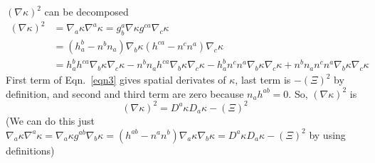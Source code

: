 \documentclass[prd]{revtex4}
\begin{document}
$(\nabla \kappa)^2$ can be decomposed
\begin{align}
\label{eqn3}
(\nabla \kappa)^2 & = \nabla_a \kappa \nabla^a \kappa = g_b^a \nabla \kappa g^{ca} \nabla_c \kappa \nonumber \\
			   & =(h_a^b - n^b n_a)\nabla_b \kappa (h^{ca}-n^c n^a)\nabla_c \kappa \nonumber \\
			   & =h_a^b h^{ca} \nabla_b \kappa \nabla_c \kappa - n^b n_a h^{ca}\nabla_b \kappa \nabla_c \kappa - h^b_a n^c n^a \nabla_b \kappa \nabla_c \kappa +n^b n_a n^c n^a \nabla_b \kappa \nabla_c \kappa
\end{align}
First term of Eqn.~\ref{eqn3} gives spatial derivates of $\kappa$, last term is $ -(\Xi)^2$ by definition, and second and third term are zero because $n_a h^{ab} = 0$. So, $(\nabla \kappa)^2$ is
\begin{equation}
\label{decompk2}
(\nabla \kappa)^2 = D^a \kappa D_a \kappa - (\Xi)^2
\end{equation}
(We can do this just $\nabla_a \kappa \nabla^a \kappa = \nabla_a \kappa g^{ab} \nabla_b \kappa = (h^{ab}-n^a n^b)\nabla_a \kappa \nabla_b \kappa = D^a \kappa D_a \kappa - (\Xi)^2$ by using definitions)
\end{document}

